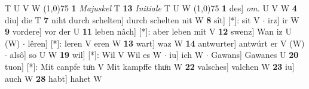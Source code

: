 \documentclass[8pt,a4paper,notitlepage]{article}
\begin{document}
\begin{table}[ht]
\begin{minipage}[t]{0.5\linewidth}
T U V W \newline
\line(1,0){75} \newline
\textbf{1} \textit{Majuskel} T  \textbf{13} \textit{Initiale} T U W  \newline
\line(1,0){75} \newline
\textbf{1} des] \textit{om.} U V W \textbf{4} diu] die T \textbf{7} niht durch schelten] durch schelten nit W \textbf{8} sît] [*]: sit V  $\cdot$ irz] ir W \textbf{9} vordere] vor der U \textbf{11} leben nâch] [*]: aber leben mit V \textbf{12} swenz] Wan iz U (W)  $\cdot$ lêren] [*]: leren V eren W \textbf{13} wart] waz W \textbf{14} antwurter] antwúrt er V (W)  $\cdot$ alsô] so U W \textbf{19} wil] [*]: Wil V Wil es W  $\cdot$ iu] ich W  $\cdot$ Gawans] Gawanes U \textbf{20} tuon] [*]: Mit canpfe tuͦn V Mit kampffe thuͦn W \textbf{22} valsches] valchen W \textbf{23} iu] auch W \textbf{28} habt] hahet W \newline
\end{minipage}
\end{table}
\end{document}
